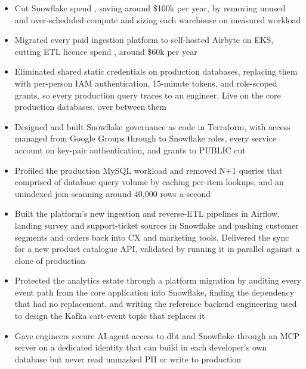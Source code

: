 \documentclass[10pt,a4paper,withhyper,ragged2e]{altacv}
\begin{document}
\begin{itemize}
  \item Cut Snowflake spend , saving around \$100k per year, by removing unused and
        over-scheduled compute and sizing each warehouse on measured workload
  \item Migrated every paid ingestion platform to self-hosted Airbyte on EKS, cutting ETL licence
        spend , around \$60k per year
  \item Eliminated shared static credentials on production databases, replacing them with
        per-person IAM authentication, 15-minute tokens, and role-scoped grants, so every
        production query traces to an engineer. Live on the core production databases, over
         between them
  \item Designed and built Snowflake governance as code in Terraform, with access managed from
        Google Groups through to Snowflake roles, every service account on key-pair authentication,
        and grants to PUBLIC cut 
  \item Profiled the production MySQL workload and removed N+1 queries that comprised
         of database query volume by caching per-item lookups, and an unindexed join
        scanning around 40,000 rows a second
  \item Built the platform's new ingestion and reverse-ETL pipelines in Airflow, landing survey and
        support-ticket sources in Snowflake and pushing customer segments and orders back into CX
        and marketing tools. Delivered the sync for a new product catalogue API, validated by
        running it in parallel against a clone of production
  \item Protected the analytics estate through a platform migration by auditing every event path
        from the core application into Snowflake, finding the dependency that had no replacement,
        and writing the reference backend engineering used to design the Kafka cart-event topic
        that replaces it
  \item Gave engineers secure AI-agent access to dbt and Snowflake through an MCP server on a
        dedicated identity that can build in each developer's own database but never read unmasked
        PII or write to production
\end{itemize}
\end{document}
